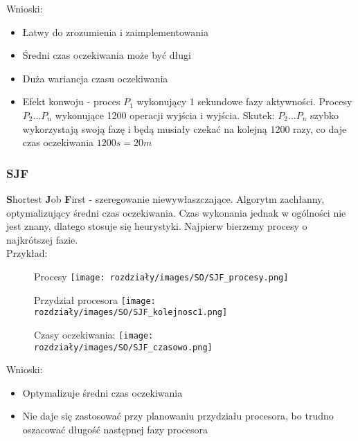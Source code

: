     Wnioski:    
    \begin{itemize}
        \item Łatwy do zrozumienia i zaimplementowania
        \item Średni czas oczekiwania może być długi
        \item Duża wariancja czasu oczekiwania
        \item Efekt konwoju - proces $P_1$ wykonujący 1 sekundowe fazy aktywności. Procesy $P_2 \ldots P_n$ wykonujące 1200 operacji wyjścia i wyjścia. Skutek: $P_2\ldots P_n$ szybko wykorzystają swoją fazę i będą musiały czekać na kolejną 1200 razy, co daje czas oczekiwania $1200s = 20m$
    \end{itemize}

\subsubsection{SJF}
    \textbf{S}hortest \textbf{J}ob \textbf{F}irst - szeregowanie niewywłaszczające. Algorytm zachłanny, optymalizujący średni czas oczekiwania. Czas wykonania jednak w ogólności nie jest znany, dlatego stosuje się heurystyki. Najpierw bierzemy procesy o najkrótszej fazie. \\ 
    
    Przykład:
    \begin{figure}[!htb]
       \begin{minipage}{0.15\textwidth}
         \centering
         Procesy
         \texttt{[image: rozdziały/images/SO/SJF\_procesy.png]}
       \end{minipage}\hfill
       \begin{minipage}{0.5\textwidth}
         \centering
         Przydział procesora
         \texttt{[image: rozdziały/images/SO/SJF\_kolejnosc1.png]}
       \end{minipage}\hfill
        \begin{minipage}{0.3\textwidth}
            \centering
            Czasy oczekiwania:
            \texttt{[image: rozdziały/images/SO/SJF\_czasowo.png]}
        \end{minipage}
    \end{figure}

    Wnioski:
    \begin{itemize}
        \item Optymalizuje średni czas oczekiwania
        \item Nie daje się zastosować przy planowaniu przydziału procesora, bo trudno oszacować długość następnej fazy procesora
    \end{itemize}

